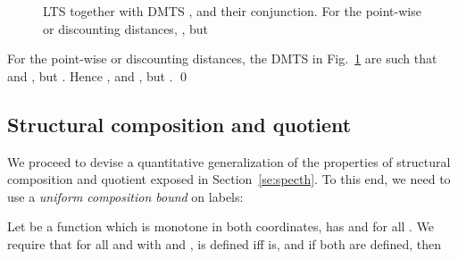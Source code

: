 \documentclass[twocolumn]{svjour3-dummy}
\begin{document}
\begin{figure}\centering
  \caption{\label{fi:ex-conj}
    LTS  together with DMTS ,  and their conjunction.
    For the point-wise or discounting distances, , but }
\end{figure}

\begin{example}
  \label{ex:no-qconj}
  For the point-wise or discounting distances, the DMTS in
  Fig.~\ref{fi:ex-conj} are such that  and , but .  Hence
  , and , but
  . \qed
\end{example}

\subsection{Structural composition and quotient}

We proceed to devise a quantitative generalization of the properties of
structural composition and quotient exposed in Section~\ref{se:specth}.
To this end, we need to use a \emph{uniform composition bound} on
labels:

Let  be a function which is monotone in both
coordinates, has 
and  for all
.  We require that for all  and  with  and ,  is
defined iff  is, and if both are defined, then
\end{document}
